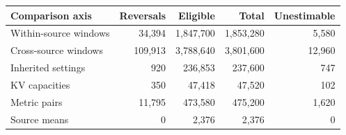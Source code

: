 \begin{tabular}{lrrrr}
\toprule
Comparison axis & Reversals & Eligible & Total & Unestimable \\
\midrule
Within-source windows & 34,394 & 1,847,700 & 1,853,280 & 5,580 \\
Cross-source windows & 109,913 & 3,788,640 & 3,801,600 & 12,960 \\
Inherited settings & 920 & 236,853 & 237,600 & 747 \\
KV capacities & 350 & 47,418 & 47,520 & 102 \\
Metric pairs & 11,795 & 473,580 & 475,200 & 1,620 \\
Source means & 0 & 2,376 & 2,376 & 0 \\
\bottomrule
\end{tabular}
